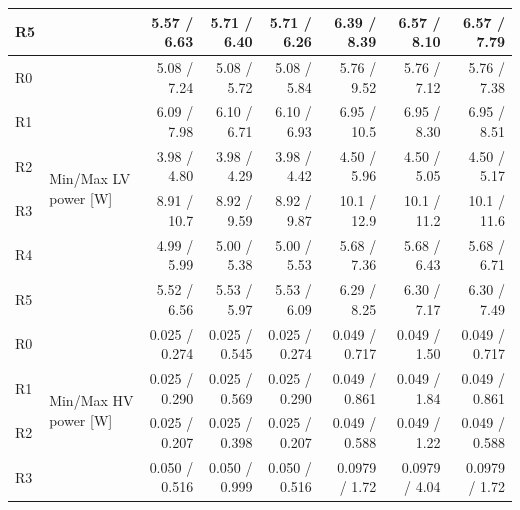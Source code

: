 \begin{table}[ht]
\begin{centering}
{\begin{tabular}{|l|l|r|r|r|r|r|r|}
R5                              &                                                                       &   5.57 / 6.63 &   5.71 / 6.40 &   5.71 / 6.26 &    6.39 / 8.39 &   6.57 / 8.10 &    6.57 / 7.79 \\ \hline
R0                              & \multirow{6}{*}{Min/Max LV power [W]}                                 &   5.08 / 7.24 &   5.08 / 5.72 &   5.08 / 5.84 &    5.76 / 9.52 &   5.76 / 7.12 &    5.76 / 7.38 \\ 
R1                              &                                                                       &   6.09 / 7.98 &   6.10 / 6.71 &   6.10 / 6.93 &    6.95 / 10.5 &   6.95 / 8.30 &    6.95 / 8.51 \\ 
R2                              &                                                                       &   3.98 / 4.80 &   3.98 / 4.29 &   3.98 / 4.42 &    4.50 / 5.96 &   4.50 / 5.05 &    4.50 / 5.17 \\ 
R3                              &                                                                       &   8.91 / 10.7 &   8.92 / 9.59 &   8.92 / 9.87 &    10.1 / 12.9 &   10.1 / 11.2 &    10.1 / 11.6 \\ 
R4                              &                                                                       &   4.99 / 5.99 &   5.00 / 5.38 &   5.00 / 5.53 &    5.68 / 7.36 &   5.68 / 6.43 &    5.68 / 6.71 \\ 
R5                              &                                                                       &   5.52 / 6.56 &   5.53 / 5.97 &   5.53 / 6.09 &    6.29 / 8.25 &   6.30 / 7.17 &    6.30 / 7.49 \\ \hline
R0                              & \multirow{6}{*}{Min/Max HV power [W]}                                 & 0.025 / 0.274 & 0.025 / 0.545 & 0.025 / 0.274 &  0.049 / 0.717 &  0.049 / 1.50 &  0.049 / 0.717 \\ 
R1                              &                                                                       & 0.025 / 0.290 & 0.025 / 0.569 & 0.025 / 0.290 &  0.049 / 0.861 &  0.049 / 1.84 &  0.049 / 0.861 \\ 
R2                              &                                                                       & 0.025 / 0.207 & 0.025 / 0.398 & 0.025 / 0.207 &  0.049 / 0.588 &  0.049 / 1.22 &  0.049 / 0.588 \\ 
R3                              &                                                                       & 0.050 / 0.516 & 0.050 / 0.999 & 0.050 / 0.516 &  0.0979 / 1.72 & 0.0979 / 4.04 &  0.0979 / 1.72 \\ 

\end{tabular}}
\end{centering}
\end{table}
